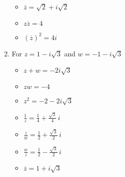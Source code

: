 \begin{enumerate}
\begin{multicols}{3}

\begin{itemize}

\item $\overline{z} = \sqrt{2}+i\sqrt{2}$

\item $z\overline{z} = 4$

\item $(\overline{z})^2 = 4i$

\end{itemize}

\end{multicols}

\item  For   $z = 1 - i\sqrt{3}$ and $w = -1-i\sqrt{3}$

\begin{multicols}{3}

\begin{itemize}

\item $z+w = -2i\sqrt{3}$

\item $zw = -4$

\item $z^2 = -2-2i\sqrt{3}$

\end{itemize}

\end{multicols}

\begin{multicols}{3}

\begin{itemize}

\item $\frac{1}{z} = \frac{1}{4} + \frac{\sqrt{3}}{4} \,i$

\item $\frac{z}{w} = \frac{1}{2} + \frac{\sqrt{3}}{2} \,i$

\item $\frac{w}{z} = \frac{1}{2} - \frac{\sqrt{3}}{2} \,i$

\end{itemize}

\end{multicols}

\begin{multicols}{3}

\begin{itemize}

\item $\overline{z} = 1+i\sqrt{3}$


\end{itemize}
\end{multicols}
\end{enumerate}
